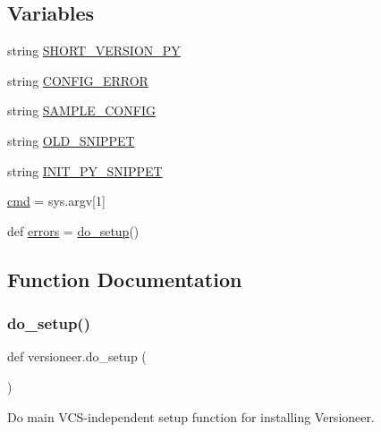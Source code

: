 \subsection*{Variables}
\begin{DoxyCompactItemize}
\item 
string \hyperlink{namespaceversioneer_af7f07d6c44384b15e99aaca5acf367b5}{S\+H\+O\+R\+T\+\_\+\+V\+E\+R\+S\+I\+O\+N\+\_\+\+PY}
\item 
string \hyperlink{namespaceversioneer_a12952044fe2d0a7c64a8e4d2b51dd66c}{C\+O\+N\+F\+I\+G\+\_\+\+E\+R\+R\+OR}
\item 
string \hyperlink{namespaceversioneer_a33e79ab0016de06c2ffab10bc03b0750}{S\+A\+M\+P\+L\+E\+\_\+\+C\+O\+N\+F\+IG}
\item 
string \hyperlink{namespaceversioneer_af52884d2628e1ddeba102845cd69c028}{O\+L\+D\+\_\+\+S\+N\+I\+P\+P\+ET}
\item 
string \hyperlink{namespaceversioneer_ac23efdab049f934e3547699a51d2b111}{I\+N\+I\+T\+\_\+\+P\+Y\+\_\+\+S\+N\+I\+P\+P\+ET}
\item 
\hyperlink{namespaceversioneer_adfc5ba7e22f5e4a6221c12a70503bef3}{cmd} = sys.\+argv\mbox{[}1\mbox{]}
\item 
def \hyperlink{namespaceversioneer_a392f48c0119ddcef4c443ca399328f8a}{errors} = \hyperlink{namespaceversioneer_a366c0b90d2355ed3559a4959cf1f2a82}{do\+\_\+setup}()
\end{DoxyCompactItemize}


\subsection{Function Documentation}
\mbox{\label{namespaceversioneer_a366c0b90d2355ed3559a4959cf1f2a82}} 
\subsubsection{\texorpdfstring{do\+\_\+setup()}{do\_setup()}}
{\footnotesize\ttfamily def versioneer.\+do\+\_\+setup (\begin{DoxyParamCaption}{ }\end{DoxyParamCaption})}

\begin{DoxyVerb}Do main VCS-independent setup function for installing Versioneer.\end{DoxyVerb}
 \mbox{\label{namespaceversioneer_a4b46348d81ccd33c835bccbb2cbabd8a}} 
